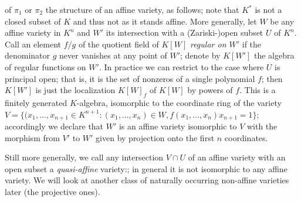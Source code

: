 \documentclass[10pt]{article}
\begin{document}
of $\pi_1$ or $\pi_2$ the structure of an affine variety, as follows;
note that $K^*$ is not a closed subset of $K$ and thus not as it stands
affine. More generally, let $W$ be any affine variety in $K^n$ and $W'$
its intersection with a (Zariski-)open subset $U$ of $K^n$. Call an
element $f/g$ of the quotient field of $K[W]$ {\sl regular on $W'$} if
the denominator $g$ never vanishes at any point of $W'$; denote by
$K[W']$ the algebra of regular functions on $W'$. In practice we can
restrict to the case where $U$ is principal open; that is, it is the set
of nonzeros of a single polynomial $f$; then $K[W']$ is just the
localization $K[W]_f$ of $K[W]$ by powers of $f$. This is a finitely
generated $K$-algebra, isomorphic to the coordinate ring of the variety
$V = \{(x_1,\ldots,x_{n+1}\in K^{n+1}: (x_1,\ldots,x_n)\in W,
f(x_1,\ldots,x_n) x_{n+1} = 1\}$; accordingly we declare that $W'$ is an
affine variety isomorphic to $V$ with the morphism from $V'$ to $W'$
given by projection onto the first $n$ coordinates.

 Still more generally, we call any intersection $V\cap U$ of an affine
 variety with an open subset a {\sl quasi-affine} variety:; in general
 it is not isomorphic to any affine variety. We will look at another
 class of naturally occurring non-affine varieties later (the projective
 ones).
\end{document}
